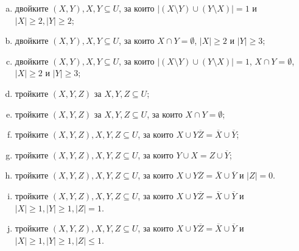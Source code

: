 \begin{problem}
\begin{enumerate}[a)]
  \item
    двойките $(X,Y), X,Y\subseteq U$, за които $|(X\setminus Y)\cup(Y\setminus X)| = 1$ и 
    $|X|\geq 2, |Y|\geq 2$;
  \item
    двойките $(X,Y), X,Y\subseteq U$, за които $X\cap Y = \emptyset$, $|X|\geq 2$ и $|Y|\geq 3$;
  \item
    двойките $(X,Y), X,Y\subseteq U$, за които $|(X\setminus Y)\cup(Y\setminus X)| = 1$, $X\cap Y = \emptyset$, $|X|\geq 2$ и $|Y|\geq 3$;
  \item
    тройките $(X,Y,Z)$ за $X,Y,Z\subseteq U$;
  \item
    тройките $(X,Y,Z)$ за $X,Y,Z\subseteq U$, за които $X \cap Y = \emptyset$;
  \item
    тройките $(X,Y,Z), X,Y,Z\subseteq U$, за които $X\cup Y\overline{Z} = \overline{X}\cup\overline{Y}$;
  \item
    тройките $(X,Y,Z), X,Y,Z\subseteq U$, за които $Y\cup X = Z\cup\overline{Y}$;
  \item
    тройките $(X,Y,Z), X,Y,Z\subseteq U$, за които $X\cup Y\overline{Z} = \overline{X}\cup\overline{Y}$ и
    $|Z| = 0$.
  \item
    тройките $(X,Y,Z), X,Y,Z\subseteq U$, за които $X\cup Y\overline{Z} = \overline{X}\cup\overline{Y}$ и
    $|X|\geq 1, |Y|\geq 1, |Z| = 1$.
  \item
    тройките $(X,Y,Z), X,Y,Z\subseteq U$, за които $X\cup Y\overline{Z} = \overline{X}\cup\overline{Y}$ и
    $|X|\geq 1, |Y|\geq 1, |Z|\leq 1$.
  \end{enumerate}
\end{problem}



